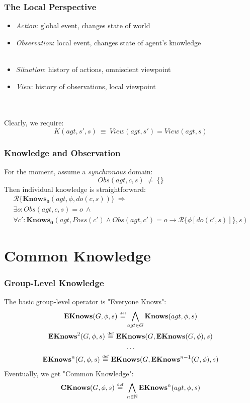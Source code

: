 \documentclass{beamer}
\newcommand{\isdef}{\hbox{$\stackrel{\mbox{\tiny def}}{=}$}}
\begin{document}
\begin{frame}
\frametitle{The Local Perspective}
\begin{itemize}
\item \emph{Action}: global event, changes state of world
\item \emph{Observation}: local event, changes state of agent's knowledge\\
\ \\
\item \emph{Situation}: history of actions, omniscient viewpoint
\item \emph{View}: history of observations, local viewpoint
\end{itemize}
\ \\
\ \\
Clearly, we require:
\begin{equation*}
K(agt,s',s)\ \equiv\ View(agt,s') = View(agt,s)
\end{equation*}
\end{frame}

\begin{frame}
\frametitle{Knowledge and Observation}

For the moment, assume a \emph{synchronous} domain:
\begin{equation*}
Obs(agt,c,s)\ \neq\ \{\}
\end{equation*}
Then individual knowledge is straightforward:
\begin{multline*}
\mathcal{R}\{\mathbf{Knows_0}(agt,\phi,do(c,s))\}\ \Rightarrow \\
\exists o: Obs(agt,c,s)=o\ \wedge\\
\forall c': \mathbf{Knows_0}(agt,Poss(c') \wedge Obs(agt,c')=o \rightarrow \mathcal{R}\{\phi[do(c',s)]\},s)
\end{multline*}
\end{frame}

\section{Common Knowledge}
\begin{frame}
\frametitle{Group-Level Knowledge}
The basic group-level operator is "Everyone Knows":
\begin{gather*}
\mathbf{EKnows}(G,\phi,s)\ \isdef \bigwedge_{agt \in G} \mathbf{Knows}(agt,\phi,s)\\
\mathbf{EKnows}^{2}(G,\phi,s)\ \isdef\ \mathbf{EKnows}(G,\mathbf{EKnows}(G,\phi),s)\\
\dots \\
\mathbf{EKnows}^{n}(G,\phi,s)\ \isdef\ \mathbf{EKnows}(G,\mathbf{EKnows}^{n-1}(G,\phi),s)
\end{gather*}
Eventually, we get "Common Knowledge":
\begin{gather*}
\mathbf{CKnows}(G,\phi,s)\ \isdef\ \bigwedge_{n\in\mathbb{N}} \mathbf{EKnows}^{n}(agt,\phi,s)
\end{gather*}
\end{frame}
\end{document}
